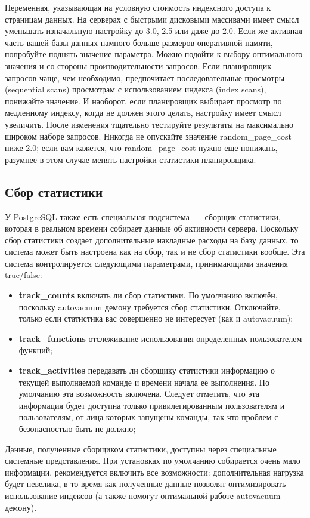 \begin{itemize}
  Переменная, указывающая на условную стоимость индексного доступа к страницам данных. На серверах с быстрыми дисковыми массивами имеет смысл уменьшать изначальную настройку до 3.0, 2.5 или даже до 2.0. Если же активная часть вашей базы данных намного больше размеров оперативной памяти, попробуйте поднять значение параметра. Можно подойти к выбору оптимального значения и со стороны производительности запросов. Если планировщик запросов чаще, чем необходимо, предпочитает последовательные просмотры (sequential scans) просмотрам с использованием индекса (index scans), понижайте значение. И наоборот, если планировщик выбирает просмотр по медленному индексу, когда не должен этого делать, настройку имеет смысл увеличить. После изменения тщательно тестируйте результаты на максимально широком наборе запросов. Никогда не опускайте значение random\_page\_cost ниже 2.0; если вам кажется, что random\_page\_cost нужно еще понижать, разумнее в этом случае менять настройки статистики планировщика.
\end{itemize}

\subsection{Сбор статистики}

У PostgreSQL также есть специальная подсистема~--- сборщик статистики,~--- которая в реальном времени собирает данные об активности сервера. Поскольку сбор статистики создает дополнительные накладные расходы на базу данных, то система может быть настроена как на сбор, так и не сбор статистики вообще. Эта система контролируется следующими параметрами, принимающими значения true/false:

\begin{itemize}
  \item \textbf{track\_counts} включать ли сбор статистики. По умолчанию включён, поскольку autovacuum демону требуется сбор статистики. Отключайте, только если статистика вас совершенно не интересует (как и autovacuum);
  \item \textbf{track\_functions} отслеживание использования определенных пользователем функций;
  \item \textbf{track\_activities} передавать ли сборщику статистики информацию о текущей выполняемой команде и времени начала её выполнения. По умолчанию эта возможность включена. Следует отметить, что эта информация будет доступна только привилегированным пользователям и пользователям, от лица которых запущены команды, так что проблем с безопасностью быть не должно;
\end{itemize}

Данные, полученные сборщиком статистики, доступны через специальные системные представления. При установках по умолчанию собирается очень мало информации, рекомендуется включить все возможности: дополнительная нагрузка будет невелика, в то время как полученные данные позволят оптимизировать использование индексов (а также помогут оптимальной работе autovacuum демону).